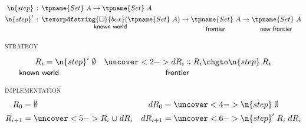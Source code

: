 \documentclass[aspectratio=169,dvipsnames]{beamer}
\newcommand\isa{\mathrel{\,\text{:}\,}}
\newcommand\iso{{\texorpdfstring{\ensuremath{\square}}{box}}}
\newcommand\tset{\tpname{Set}~}
\begin{document}

  \begin{frame}
      \begin{align*}
        \n{step} &\isa \tset A \to \tset A
        \\
        \n{step}' &\isa
        \underexplain{}{4cm}{\vspace{-3.43pt}known world}{\iso(\tset A)}
        \to \underexplain{}{1.8cm}{frontier}{\tset A}
        \to \underexplain{}{2cm}{new frontier}{\tset A}
      \end{align*}
      \vspace{0pt}

      \textsc{strategy}
      \begin{align*}
        \underexplain{}{2cm}{known world}{{R_i}} &= \n{step}^i\;\emptyset
        &\uncover<2->{\chg{\underexplain{}{1.5cm}{frontier}{{dR_i}}}{R_i}{\n{step}\;R_i}}
      \end{align*}
      \vspace{0pt}\pause\pause

      \textsc{implementation}
      \begin{align*}
        R_0 &= \emptyset %
        & dR_0 &= \uncover<4->{\n{step}\;\emptyset} %
        \\
        R_{i+1} &= \uncover<5->{R_i \cup dR_i} %
        & dR_{i+1} &= \uncover<6->{\n{step}' \;R_i \;dR_i}
      \end{align*}
      \vspace{\baselineskip}
  \end{frame}




\end{document}
